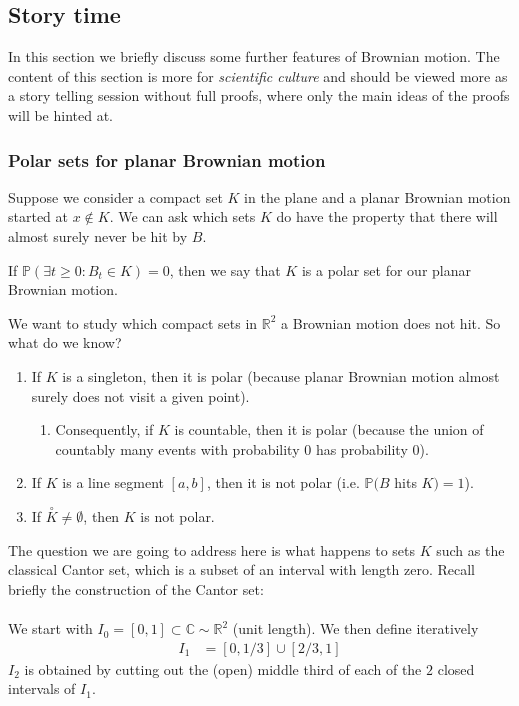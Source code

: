 \documentclass[../mainfile.tex]{subfiles}
\begin{document}
\subsection{Story time} 
In this section we briefly discuss some further features of Brownian motion. The content of this section is more for \textit{scientific culture} and should be viewed more as a story telling session without full proofs, where only the main ideas of the proofs will be hinted at. 
\subsubsection{Polar sets for planar Brownian motion}
Suppose we consider a compact set $K$ in the plane and a planar Brownian motion started at $x \notin K$. We can ask which sets $K$ do have the property that there will almost surely never be hit by $B$. 
\begin{defn} If $\mathbb{P}( \exists t \geq 0 : B_t \in K)=0$, then we say that $K$ is a polar set for our planar Brownian motion. 
\end{defn}
We want to study which compact sets in $\mathbb{R}^2$ a Brownian motion does not hit. So what do we know?
\begin{enumerate}
\item If $K$ is a singleton, then it is polar (because planar Brownian motion almost surely does not visit a given point). 
\begin{enumerate}
\item Consequently, if $K$ is countable, then it is polar (because the union of countably many events with probability $0$ has probability $0$). 
\end{enumerate}
\item If $K$ is a line segment $[a,b]$, then it is not polar (i.e. $\mathbb{P}(B$ hits $K)=1$).
\item If $\overset{\circ}K \neq \emptyset$, then $K$ is not polar. 
\end{enumerate}
The question we are going to address here is what happens to sets $K$ such as the classical Cantor set, which is a subset of an interval with length zero. Recall briefly the construction of the Cantor set:\\
\\
We start with $I_0=[0,1] \subset \mathbb{C} \sim \mathbb{R}^2$ (unit length). We then define iteratively \begin{align*}
I_1&= [0,1/3] \cup [2/3,1]
\end{align*}
$I_2$ is obtained by cutting out the (open) middle third of each of the $2$ closed intervals of $I_1$.\\
\end{document}
